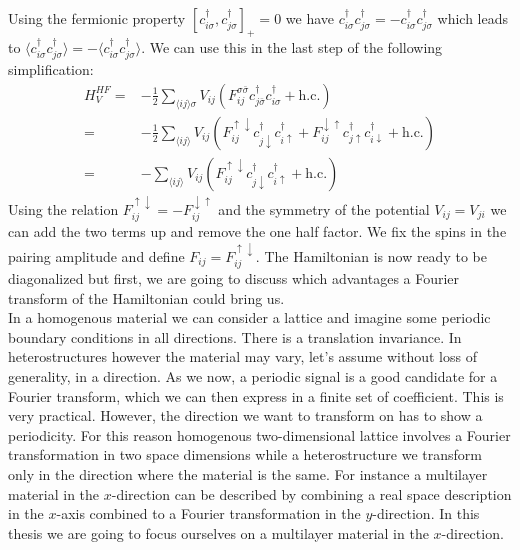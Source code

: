 \documentclass[../main.tex]{subfile}
\begin{document}
Using the fermionic property $[c_{i\sigma}^{\dagger},c_{j\sigma}^{\dagger}]_+ = 0$ we have $c_{i\sigma}^{\dagger} c_{j\sigma}^{\dagger} = -c_{i\sigma}^{\dagger} c_{j\sigma}^{\dagger}$
which leads to $\langle  c_{i\sigma}^{\dagger} c_{j\sigma}^{\dagger} \rangle = -\langle c_{i\sigma}^{\dagger} c_{j\sigma}^{\dagger}\rangle$. We can use this in the last step of the following simplification:
\begin{equation}\label{eq:HF_V}
    \begin{aligned}
        H^{HF}_V =& -\frac{1}{2} \sum_{\langle ij\rangle \sigma} V_{ij} \left(F_{ij}^{\sigma \bar{\sigma}} c^{\dagger}_{j\bar{\sigma}}c^{\dagger}_{i\sigma} + \text{h.c.}\right)\\
            =& -\frac{1}{2}\sum_{\langle ij\rangle} V_{ij} \left(F_{ij}^{\uparrow \downarrow} c^{\dagger}_{j\downarrow}c^{\dagger}_{i\uparrow} + F_{ij}^{\downarrow\uparrow} c^{\dagger}_{j\uparrow}c^{\dagger}_{i\downarrow} + \text{h.c.}\right)\\
            =& -\sum_{\langle ij\rangle} V_{ij} \left(F_{ij}^{\uparrow \downarrow} c^{\dagger}_{j\downarrow}c^{\dagger}_{i\uparrow} + \text{h.c.}\right)
    \end{aligned}
\end{equation}
Using the relation $F_{ij}^{\uparrow\downarrow} = -F_{ij}^{\downarrow\uparrow}$ and the symmetry of the potential $V_{ij} = V_{ji}$ we can add the two terms up and remove the one half factor.
We fix the spins in the pairing amplitude and define $F_{ij} = F_{ij}^{\uparrow\downarrow}$.
The Hamiltonian is now ready to be diagonalized but first, we are going to discuss which advantages a Fourier transform of the Hamiltonian could bring us.\\
 
In a homogenous material we can consider a lattice and imagine some periodic boundary conditions in all directions. There is a translation invariance.
In heterostructures however the material may vary, let's assume
without loss of generality, in a direction. As we now, a periodic signal is a good candidate for a Fourier transform, which we can then express in a finite set of coefficient. 
This is very practical.
However, the direction we want to transform on has to show a periodicity. For this reason homogenous two-dimensional lattice involves a Fourier transformation in two space dimensions while a heterostructure
we transform only in the direction where the material is the same. For instance a multilayer material in the $x$-direction can be described by combining a real space description in the $x$-axis 
combined to a Fourier transformation in the $y$-direction.
In this thesis we are going to focus ourselves on a multilayer material in the $x$-direction.\\
\end{document}
